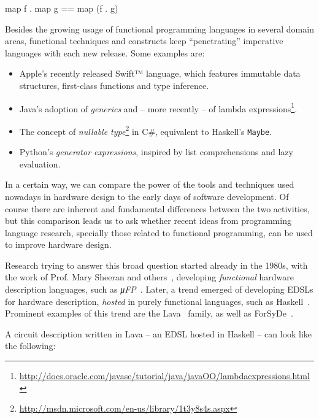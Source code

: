     {\centering
        \begin{haskellcode}
            map f . map g == map (f . g)
        \end{haskellcode}
    }

    Besides the growing usage of functional programming languages in several domain areas,
    functional techniques and constructs keep ``penetrating'' imperative languages
    with each new release. Some examples are:

    \begin{itemize}
        \item Apple's recently released Swift™ language, which features immutable data structures,
            first-class functions and type inference.
        \item Java's adoption of \emph{generics} and -- more recently -- of lambda
            expressions\footnote{\url{http://docs.oracle.com/javase/tutorial/java/javaOO/lambdaexpressions.html}}.
        \item The concept of \emph{nullable type}\footnote{\url{http://msdn.microsoft.com/en-us/library/1t3y8s4s.aspx}}
            in C\#, equivalent to Haskell's \texttt{Maybe}.
        \item Python's \emph{generator expressions}, inspired by list comprehensions and lazy evaluation.
    \end{itemize}

    In a certain way, we can compare the power of the tools and techniques
    used nowadays in hardware design to the early days of software development.
    Of course there are inherent and fundamental differences between the two activities, but
    this comparison leads us to ask whether recent ideas from programming language research,
    specially those related to functional programming, can be used to improve hardware design.

    Research trying to answer this broad question started already in the 1980s,
    with the work of Prof. Mary Sheeran and others~\cite{sheeran-survey},
    developing \emph{functional} hardware description languages, such as \emph{μFP}~\cite{mufp-1984}.
    Later, a trend emerged of developing \acp{EDSL} for hardware description,
    \emph{hosted} in purely functional languages, such as Haskell~\cite{haskell2010}.
    Prominent examples of this trend are the Lava~\cite{lava-1999} family,
    as well as ForSyDe~\cite{forsyde1999}.

    A circuit description written in Lava -- an \ac{EDSL} hosted in Haskell -- can look like the following:


